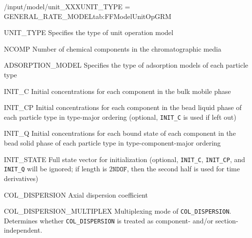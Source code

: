 \begin{condsubgroup}{/input/model/unit\_XXX}{UNIT\_TYPE = GENERAL\_RATE\_MODEL}{tab:FFModelUnitOpGRM}
  \begin{dataset}[type=string,range={\texttt{GENERAL\_RATE\_MODEL}},length=1]{UNIT\_TYPE}
    Specifies the type of unit operation model
  \end{dataset}
  \begin{dataset}[type=int,range={$\geq 1$},length=1]{NCOMP}
    Number of chemical components in the chromatographic media
  \end{dataset}
  \begin{dataset}[type=string,range={See Section~\ref{sec:FFAdsorption}},length={\texttt{NPARTYPE}}]{ADSORPTION\_MODEL}
    Specifies the type of adsorption models of each particle type
  \end{dataset}
  \begin{dataset}[unit=\si{\mol\per\cubic\metre\of{IV}},type=double,range={$\geq 0$},length={\texttt{NCOMP}}]{INIT\_C}
    Initial concentrations for each component in the bulk mobile phase
  \end{dataset}
  \begin{dataset}[unit=\si{\mol\per\cubic\metre\of{MP}},type=double,range={$\geq 0$},length={$\texttt{NPARTYPE} \cdot \texttt{NCOMP}$}]{INIT\_CP}
    Initial concentrations for each component in the bead liquid phase of each particle type in type-major ordering (optional, \texttt{INIT\_C} is used if left out)
  \end{dataset}
  \begin{dataset}[unit=\si{\mol\per\cubic\metre\of{SP}},type=double,range={$\geq 0$},length={\texttt{NTOTALBND}}]{INIT\_Q}
    Initial concentrations for each bound state of each component in the bead solid phase of each particle type in type-component-major ordering
  \end{dataset}
  \begin{dataset}[unit=various,type=double,range={$\mathds{R}$},length={\texttt{NDOF} / $2\texttt{NDOF}$}]{INIT\_STATE}
    Full state vector for initialization (optional, \texttt{INIT\_C}, \texttt{INIT\_CP}, and \texttt{INIT\_Q} will be ignored; if length is $2\texttt{NDOF}$, then the second half is used for time derivatives)
  \end{dataset}
  \begin{dataset}[unit=\si{\square\metre\of{IV}\per\second},type=double,range={$\geq 0$},length={see \texttt{{COL\_DISPERSION\_MULTIPLEX}}}]{COL\_DISPERSION}
    Axial dispersion coefficient
  \end{dataset}
  \begin{dataset}[unit=--,type=int,range={$\{0, \dots, 3 \}$},length={1}]{COL\_DISPERSION\_MULTIPLEX}
    Multiplexing mode of \texttt{COL\_DISPERSION}.
    Determines whether \texttt{COL\_DISPERSION} is treated as component- and/or section-independent.


\end{dataset}
\end{condsubgroup}
